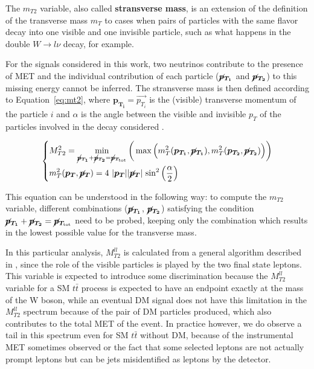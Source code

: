 \documentclass[a4paper, 10pt, openright]{report}
\begin{document}
The $m_{T2}$ variable, also called \textbf{stransverse mass}, is an extension of the definition of the transverse mass $m_T$ to cases when pairs of particles with the same flavor decay into one visible and one invisible particle, such as what happens in the double $W \rightarrow l\nu$ decay, for example. 

For the signals considered in this work, two neutrinos contribute to the presence of \ac{MET} and the individual contribution of each particle ($\bm{\cancel{p}_{T_{1}}}$ and $\bm{\cancel{p}_{T_2}}$) to this missing energy cannot be inferred. The stransverse mass is then defined according to Equation~\ref{eq:mt2}, where $\bm{p_{T_i}} = \overrightarrow{p_{T_i}}$ is the (visible) transverse momentum of the particle $i$ and $\alpha$ is the angle between the visible and invisible $p_T$ of the particles involved in the decay considered \cite{MT2}.

\begin{equation}
\label{eq:mt2}
\begin{dcases}
M_{T2}^2 = \min_{\bm{\cancel{p}_{T_{1}}} + \bm{\cancel{p}_{T_{2}}} = \bm{\cancel{p}_{T_{\text{tot}}}}} \bigg (\max \Big (m_T^2(\bm{p_{T_1}}, \bm{\cancel{p}_{T_{1}}}), m_T^2(\bm{p_{T_2}}, \bm{\cancel{p}_{T_{2}}}) \Big ) \bigg ) \\
m_T^2(\bm{p_{T}}, \bm{\cancel{p}_{T}}) = 4 \text{ } |\bm{p_{T}}| |\bm{\cancel{p}_{T}}| \text{ sin}^2 \left (\frac{\alpha}{2} \right ) 
\end{dcases}
\end{equation}

This equation can be understood in the following way: to compute the $m_{T2}$ variable, different combinations ($\bm{\cancel{p}_{T_{1}}}$, $\bm{\cancel{p}_{T_{2}}}$) satisfying the condition $\bm{\cancel{p}_{T_{1}}} + \bm{\cancel{p}_{T_{2}}} = \bm{\cancel{p}_{T_{\text{tot}}}}$ need to be probed, keeping only the combination which results in the lowest possible value for the transverse mass.

In this particular analysis, $M_{T2}^{ll}$ is calculated from a general algorithm described in \cite{MT2Calc}, since the role of the visible particles is played by the two final state leptons. This variable is expected to introduce some discrimination because the $M_{T2}^{ll}$ variable for a \ac{SM} $t \bar t$ process is expected to have an endpoint exactly at the mass of the W boson, while an eventual \ac{DM} signal does not have this limitation in the $M_{T2}^{ll}$ spectrum because of the pair of \ac{DM} particles produced, which also contributes to the total \ac{MET} of the event. In practice however, we do observe a tail in this spectrum even for \ac{SM} $t \bar t$ without \ac{DM}, because of the instrumental \ac{MET} sometimes observed or the fact that some selected leptons are not actually prompt leptons but can be jets misidentified as leptons by the detector.
\end{document}
